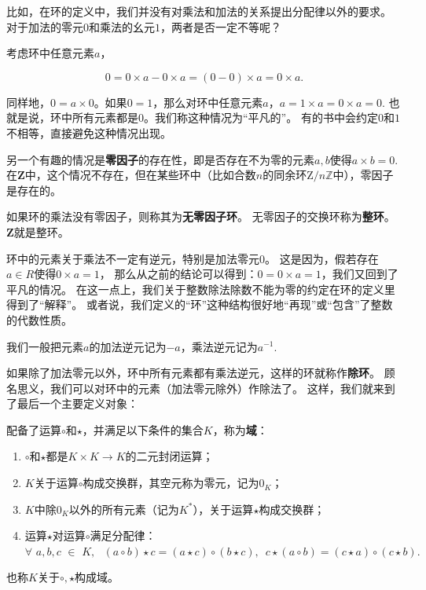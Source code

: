 \documentclass[12pt,UTF8]{ctexbook}
\begin{document}
\begin{appendix}
比如，在环的定义中，我们并没有对乘法和加法的关系提出分配律以外的要求。
对于加法的零元$0$和乘法的幺元$1$，两者是否一定不等呢？

考虑环中任意元素$a$，

$$ 0 = 0\times a - 0\times a = (0 - 0)\times a = 0 \times a.$$

同样地，$0 = a\times 0$。如果$0 = 1$，那么对环中任意元素$a$，$a = 1\times a = 0\times a = 0$.
也就是说，环中所有元素都是$0$。我们称这种情况为“平凡的”。
有的书中会约定$0$和$1$不相等，直接避免这种情况出现。

另一个有趣的情况是\textbf{零因子}的存在性，即是否存在不为零的元素$a, b$使得$a\times b = 0$.
在$\mathbf{Z}$中，这个情况不存在，但在某些环中（比如合数$n$的同余环$\mathrm{Z}/n\mathbb{Z}$中），零因子是存在的。

如果环的乘法没有零因子，则称其为\textbf{无零因子环}。
无零因子的交换环称为\textbf{整环}。$\mathbf{Z}$就是整环。

环中的元素关于乘法不一定有逆元，特别是加法零元$0$。
这是因为，假若存在$a\in R$使得$0\times a = 1$，
那么从之前的结论可以得到：$0 = 0\times a = 1$，我们又回到了平凡的情况。
在这一点上，我们关于整数除法除数不能为零的约定在环的定义里得到了“解释”。
或者说，我们定义的“环”这种结构很好地“再现”或“包含”了整数的代数性质。

我们一般把元素$a$的加法逆元记为$-a$，乘法逆元记为$a^{-1}$.

如果除了加法零元以外，环中所有元素都有乘法逆元，这样的环就称作\textbf{除环}。
顾名思义，我们可以对环中的元素（加法零元除外）作除法了。
这样，我们就来到了最后一个主要定义对象：

\begin{df}\label{df:0_3}
    配备了运算$\circ$和$\star$，并满足以下条件的集合$K$，称为\textbf{域}：

    \begin{enumerate}
        \item $\circ$和$\star$都是$K \times K \rightarrow K$的二元封闭运算；
        \item $K$关于运算$\circ$构成交换群，其空元称为零元，记为$0_{K}$；
        \item $K$中除$0_{K}$以外的所有元素（记为$K^*$），关于运算$\star$构成交换群；
        \item 运算$\star$对运算$\circ$满足分配律：$\forall \,\, a, b, c \,\, \in \,\, K, \,\,\,\, (a \circ b) \star c = (a \star c) \circ (b \star c), \,\,\, c\star (a \circ b) = (c \star a) \circ (c \star b).$
    \end{enumerate}
    也称$K$关于$\circ, \star$构成域。
\end{df}


\end{appendix}
\end{document}
